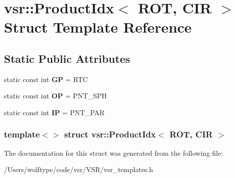 \hypertarget{structvsr_1_1_product_idx_3_01_r_o_t_00_01_c_i_r_01_4}{\section{vsr\-:\-:Product\-Idx$<$ R\-O\-T, C\-I\-R $>$ Struct Template Reference}
\label{structvsr_1_1_product_idx_3_01_r_o_t_00_01_c_i_r_01_4}
}
\subsection*{Static Public Attributes}
\begin{DoxyCompactItemize}
\item 
\hypertarget{structvsr_1_1_product_idx_3_01_r_o_t_00_01_c_i_r_01_4_a87f7ed332f8c44d1f61ac235f0052cb3}{static const int {\bfseries G\-P} = R\-T\-C}\label{structvsr_1_1_product_idx_3_01_r_o_t_00_01_c_i_r_01_4_a87f7ed332f8c44d1f61ac235f0052cb3}

\item 
\hypertarget{structvsr_1_1_product_idx_3_01_r_o_t_00_01_c_i_r_01_4_a1940d6e2d37423ec04d9bbba04a205d9}{static const int {\bfseries O\-P} = P\-N\-T\-\_\-\-S\-P\-H}\label{structvsr_1_1_product_idx_3_01_r_o_t_00_01_c_i_r_01_4_a1940d6e2d37423ec04d9bbba04a205d9}

\item 
\hypertarget{structvsr_1_1_product_idx_3_01_r_o_t_00_01_c_i_r_01_4_a6505a4ff1f5c5768ae5ce35eea74d7aa}{static const int {\bfseries I\-P} = P\-N\-T\-\_\-\-P\-A\-R}\label{structvsr_1_1_product_idx_3_01_r_o_t_00_01_c_i_r_01_4_a6505a4ff1f5c5768ae5ce35eea74d7aa}

\end{DoxyCompactItemize}
\subsubsection*{template$<$$>$ struct vsr\-::\-Product\-Idx$<$ R\-O\-T, C\-I\-R $>$}



The documentation for this struct was generated from the following file\-:\begin{DoxyCompactItemize}
\item 
/\-Users/wolftype/code/vsr/\-V\-S\-R/vsr\-\_\-templates.\-h\end{DoxyCompactItemize}
